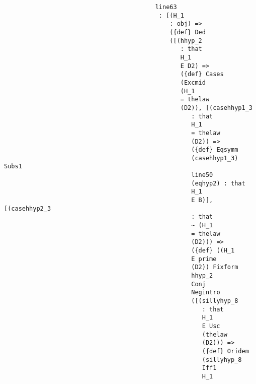 \documentclass[12pt]{article}
\begin{document}
\begin{verbatim}
                                          line63 
                                           : [(H_1 
                                              : obj) => 
                                              ({def} Ded 
                                              ([(hhyp_2 
                                                 : that 
                                                 H_1 
                                                 E D2) => 
                                                 ({def} Cases 
                                                 (Excmid 
                                                 (H_1 
                                                 = thelaw 
                                                 (D2)), [(casehhyp1_3 
                                                    : that 
                                                    H_1 
                                                    = thelaw 
                                                    (D2)) => 
                                                    ({def} Eqsymm 
                                                    (casehhyp1_3) Subs1 
                                                    line50 
                                                    (eqhyp2) : that 
                                                    H_1 
                                                    E B)], [(casehhyp2_3 
                                                    : that 
                                                    ~ (H_1 
                                                    = thelaw 
                                                    (D2))) => 
                                                    ({def} ((H_1 
                                                    E prime 
                                                    (D2)) Fixform 
                                                    hhyp_2 
                                                    Conj 
                                                    Negintro 
                                                    ([(sillyhyp_8 
                                                       : that 
                                                       H_1 
                                                       E Usc 
                                                       (thelaw 
                                                       (D2))) => 
                                                       ({def} Oridem 
                                                       (sillyhyp_8 
                                                       Iff1 
                                                       H_1 

\end{verbatim}
\end{document}
